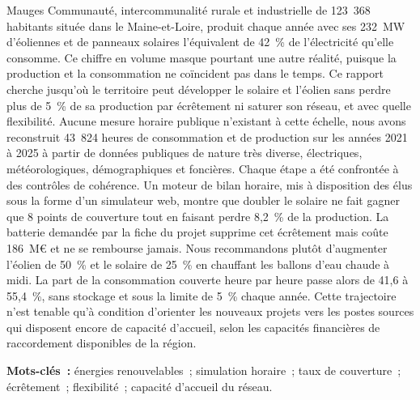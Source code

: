 Mauges Communauté, intercommunalité rurale et industrielle de 123~368 habitants située dans le Maine-et-Loire, produit chaque année avec ses 232~MW d'éoliennes et de panneaux solaires l'équivalent de 42~\% de l'électricité qu'elle consomme. Ce chiffre en volume masque pourtant une autre réalité, puisque la production et la consommation ne coïncident pas dans le temps. Ce rapport cherche jusqu'où le territoire peut développer le solaire et l'éolien sans perdre plus de 5~\% de sa production par écrêtement ni saturer son réseau, et avec quelle flexibilité. Aucune mesure horaire publique n'existant à cette échelle, nous avons reconstruit 43~824 heures de consommation et de production sur les années 2021 à 2025 à partir de données publiques de nature très diverse, électriques, météorologiques, démographiques et foncières. Chaque étape a été confrontée à des contrôles de cohérence. Un moteur de bilan horaire, mis à disposition des élus sous la forme d'un simulateur web, montre que doubler le solaire ne fait gagner que 8 points de couverture tout en faisant perdre 8,2~\% de la production. La batterie demandée par la fiche du projet supprime cet écrêtement mais coûte 186~M€ et ne se rembourse jamais. Nous recommandons plutôt d'augmenter l'éolien de 50~\% et le solaire de 25~\% en chauffant les ballons d'eau chaude à midi. La part de la consommation couverte heure par heure passe alors de 41,6 à 55,4~\%, sans stockage et sous la limite de 5~\% chaque année. Cette trajectoire n'est tenable qu'à condition d'orienter les nouveaux projets vers les postes sources qui disposent encore de capacité d'accueil, selon les capacités financières de raccordement disponibles de la région.

\vspace{0.3cm}
\noindent\textbf{Mots-clés~:} énergies renouvelables~; simulation horaire~; taux de couverture~; écrêtement~; flexibilité~; capacité d'accueil du réseau.
